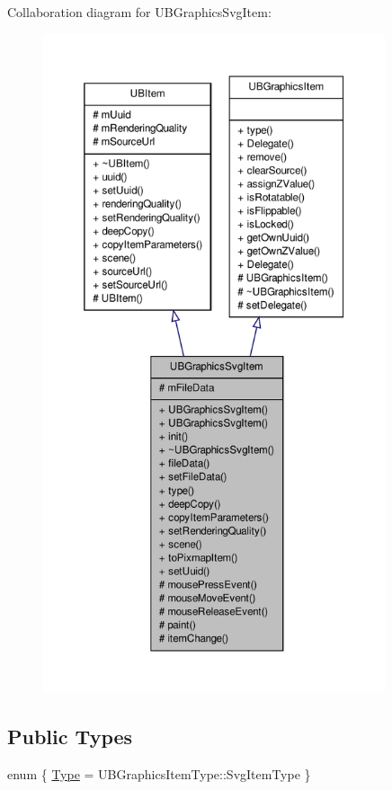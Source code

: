 Collaboration diagram for U\-B\-Graphics\-Svg\-Item\-:
\nopagebreak
\begin{figure}[H]
\begin{center}
\leavevmode
\includegraphics[height=550pt]{d0/dd5/class_u_b_graphics_svg_item__coll__graph}
\end{center}
\end{figure}
\subsection*{Public Types}
\begin{DoxyCompactItemize}
\item 
enum \{ \hyperlink{class_u_b_graphics_svg_item_a302cf0b20dc15004e1b6e434eefe7be3a3f3431da10951964803c71682b2768d7}{Type} =  U\-B\-Graphics\-Item\-Type\-:\-:Svg\-Item\-Type
 \}
\end{DoxyCompactItemize}

